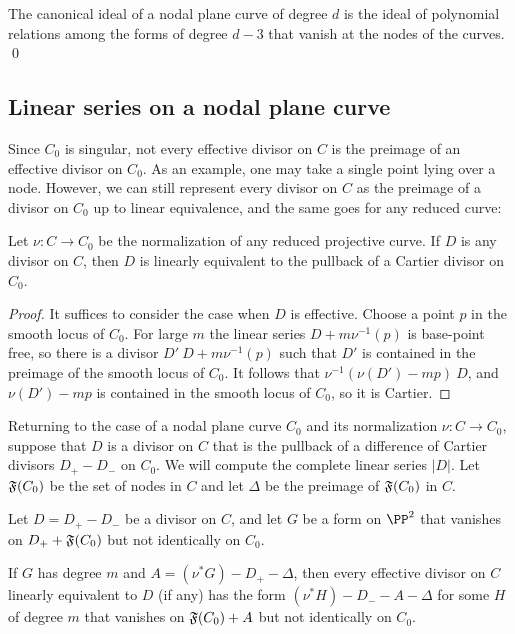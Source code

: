 \begin{corollary}
 The canonical ideal of a nodal plane curve of degree $d$ is the ideal of polynomial relations
 among the forms of degree $d-3$ that vanish at the nodes of the curves. \qed
\end{corollary}

\subsection{Linear series on a nodal plane curve}\label{linear series on nodal plane curves}

Since $C_{0}$ is singular, not every effective divisor on $C$ is the preimage of an
effective divisor on $C_{0}$. As an example, one may take a single point lying over a node. However,
we can still represent every divisor on $C$ as the preimage of a divisor on $C_{0}$ up to linear
equivalence, and the same goes for any reduced curve:

\begin{lemma}
Let $\nu: C\to C_{0}$ be the normalization of any reduced projective curve. If $D$ is any divisor
on $C$, then $D$ is linearly equivalent to the pullback of a Cartier divisor on $C_{0}$.
\end{lemma}

\begin{proof}
It suffices to consider the case when $D$ is effective. Choose a point $p$ in the
smooth locus of $C_{0}$. For large $m$ the linear series $D+m\nu^{-1}(p)$ is base-point free,
so there is a divisor $D'~D+m\nu^{-1}(p)$ such that $D'$ is contained in the preimage of the 
smooth locus of $C_{0}$. It follows that $\nu^{-1}(\nu(D')-mp) ~D$, and $\nu(D')-mp$ is contained
in the smooth locus of $C_{0}$, so it is Cartier.
\end{proof}

Returning to the case of a nodal plane curve $C_{0}$ and its normalization $\nu: C\to C_{0}$,
suppose that $D$ is a divisor on $C$ that is the pullback of a difference of Cartier
divisors $D_{+}-D_{-}$ on $C_{0}$. We will compute the complete linear series $|D|$.
Let $\adj(C_{0})$ be the set of nodes in $C$ and let $\Delta$ be the preimage of $\adj(C_{0})$ in $C$.

\begin{theorem}\label{linear series on nodal curves}
Let $D = D_{+}-D_{-}$ be a divisor on $C$, and let $G$ be a form on $\PP^{2}$ 
that vanishes on  $D_{+}+\adj(C_{0})$ but not identically on $C_{0}$.

If $G$ has degree $m$ and $A = (\nu^{*}G)-D_{+}-\Delta$, then every effective divisor on
$C$ linearly equivalent to $D$ (if any) has the form $(\nu^*H)-D_{-}-A-\Delta$ for some $H$ of degree $m$
that vanishes on $\adj(C_{0})+A$ but not identically on $C_{0}$.
\end{theorem}

